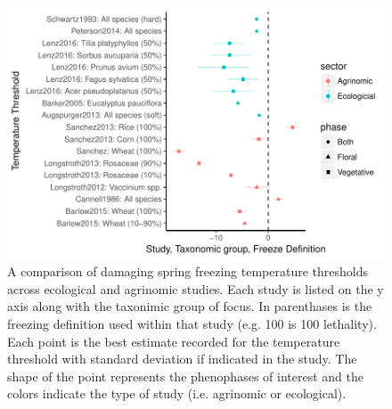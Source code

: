 \documentclass{article}\usepackage[]{graphicx}\usepackage[]{color}
\makeatletter
\def\maxwidth{ %
  \ifdim\Gin@nat@width>\linewidth
    \linewidth
  \else
    \Gin@nat@width
  \fi
}
\makeatother
\begin{document}
\begin{figure}[H]

{\centering \includegraphics[width=\maxwidth]{figure/temp-1} 

}

\caption[A comparison of damaging spring freezing temperature thresholds across ecological and agrinomic studies]{A comparison of damaging spring freezing temperature thresholds across ecological and agrinomic studies. Each study is listed on the y axis along with the taxonimic group of focus. In parenthases is the freezing definition used within that study (e.g. 100 is 100 lethality). Each point is the best estimate recorded for the temperature threshold with standard deviation if indicated in the study. The shape of the point represents the phenophases of interest and the colors indicate the type of study (i.e. agrinomic or ecological).}\label{fig:temp}
\end{figure}
\end{document}
